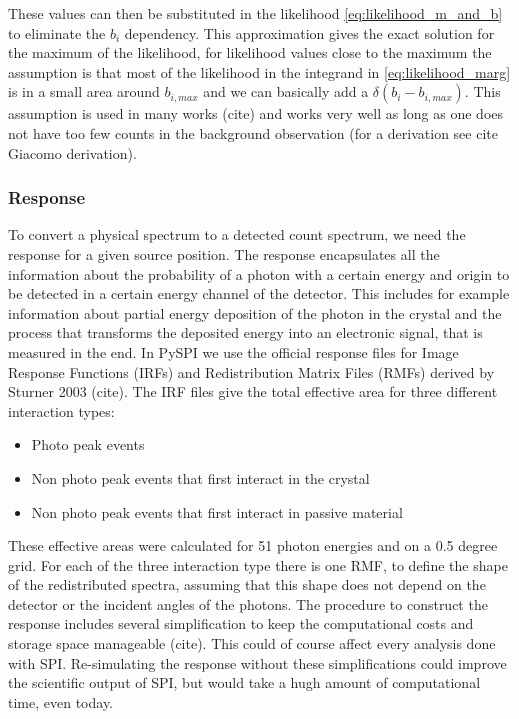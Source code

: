 \documentclass[twocolumn]{aa}
\begin{document}
These values can then be substituted in the likelihood \ref{eq:likelihood_m_and_b} to eliminate the $b_{i}$ dependency. This approximation gives the exact solution for the maximum of the likelihood, for likelihood values close to the maximum the assumption is that most of the likelihood in the integrand in \ref{eq:likelihood_marg} is in a small area around $b_{i,max}$ and we can basically add a $\delta(b_{i}-b_{{i,max}})$. This assumption is used in many works (cite) and works very well as long as one does not have too few counts in the background observation (for a derivation see cite Giacomo derivation).

\subsubsection*{Response}

To convert a physical spectrum to a detected count spectrum, we need the response for a given source position. The response encapsulates all the information about the probability of a photon with a certain energy and origin to be detected in a certain energy channel of the detector. This includes for example information about partial energy deposition of the photon in the crystal and the process that transforms the deposited energy into an electronic signal, that is measured in the end.
In PySPI we use the official response files for Image Response Functions (IRFs) and Redistribution Matrix Files (RMFs) derived by Sturner 2003 (cite). The IRF files give the total effective area for three different interaction types:
\begin{itemize}
  \item Photo peak events
  \item Non photo peak events that first interact in the crystal
  \item Non photo peak events that first interact in passive material
\end{itemize}

These effective areas were calculated for 51 photon energies and on a 0.5 degree grid. For each of the three interaction type there is one RMF, to define the shape of the redistributed spectra, assuming that this shape does not depend on the detector or the incident angles of the photons.
The procedure to construct the response includes several simplification to keep the computational costs and storage space manageable (cite). This could of course affect every analysis done with SPI. Re-simulating the response without these simplifications could improve the scientific output of SPI, but would take a hugh amount of computational time, even today.
\end{document}
